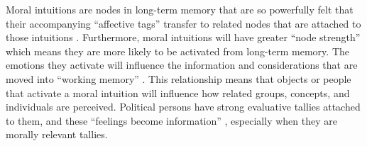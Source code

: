 Moral intuitions are nodes in long-term memory that are so powerfully felt that their accompanying ``affective tags'' transfer to related nodes that are attached to those intuitions \cite{Haidt2001,Haidt2012}. Furthermore, moral intuitions will have greater ``node strength'' which means they are more likely to be activated from long-term memory. The emotions they activate will influence the information and considerations that are moved into ``working memory'' \cite[202-203]{TaberLodgeGlathar2001}. This relationship means that objects or people that activate a moral intuition will influence how related groups, concepts, and individuals are perceived. Political persons have strong evaluative tallies attached to them, and these ``feelings become information'' \cite[456]{LodgeTaber2005}, especially when they are morally relevant tallies.

